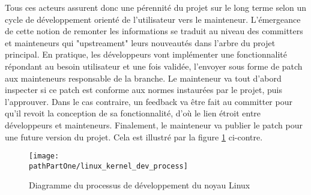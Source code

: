 Tous ces acteurs assurent donc une pérennité du projet sur le long terme selon
un cycle de développement orienté de l'utilisateur vers le mainteneur.
L'émergeance de cette notion de remonter les informations se traduit au niveau
des committers et mainteneurs qui "upstreament" leurs nouveautés dans l'arbre
du projet principal. En pratique, les développeurs vont implémenter une
fonctionnalité répondant au besoin utilisateur et une fois validée, l'envoyer
sous forme de patch aux mainteneurs responsable de la branche. Le mainteneur
va tout d'abord inspecter si ce patch est conforme aux normes instaurées par
le projet, puis l'approuver. Dans le cas contraire, un feedback va être fait
au committer pour qu'il revoit la conception de sa fonctionnalité, d'où le
lien étroit entre développeurs et mainteneurs. Finalement, le mainteneur va
publier le patch pour une future version du projet. Cela est illustré par la
figure \ref{fig:linux_kernel_dev_process} ci-contre. \\

\begin{figure}[H]
	\begin{center}
		\texttt{[image: \\pathPartOne/linux\_kernel\_dev\_process]}
		\caption{Diagramme du processus de développement du noyau Linux}
	    \label{fig:linux_kernel_dev_process}
	\end{center}
\end{figure}

